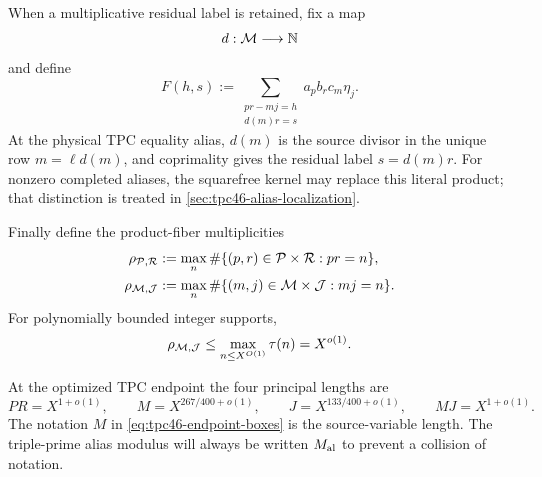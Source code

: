 When a multiplicative residual label is retained, fix a map
\begin{equation}
 d:\mathcal M\longrightarrow\mathbb N
 \label{eq:tpc46-d-map}
\end{equation}
and define
\begin{equation}
 F(h,s)
 :=\sum_{\substack{pr-mj=h\\d(m)r=s}}
 a_pb_rc_m\eta_j.
 \label{eq:tpc46-residual-packet}
\end{equation}
At the physical TPC equality alias, \(d(m)\) is the source divisor in
the unique row \(m=\ell d(m)\), and coprimality gives the residual label
\(s=d(m)r\).  For nonzero completed aliases, the squarefree kernel may
replace this literal product; that distinction is treated in
\cref{sec:tpc46-alias-localization}.

Finally define the product-fiber multiplicities
\begin{align}
 \rho_{\mathcal P,\mathcal R}
 &:=
 \max_n\#\{(p,r)\in\mathcal P\times\mathcal R:pr=n\},
 \label{eq:tpc46-rho-pr}\\
 \rho_{\mathcal M,\mathcal J}
 &:=
 \max_n\#\{(m,j)\in\mathcal M\times\mathcal J:mj=n\}.
 \label{eq:tpc46-rho-mj}
\end{align}
For polynomially bounded integer supports,
\begin{equation}
 \rho_{\mathcal M,\mathcal J}
 \le\max_{n\le X^{O(1)}}\tau(n)=X^{o(1)}.
 \label{eq:tpc46-divisor-multiplicity}
\end{equation}

At the optimized TPC endpoint the four principal lengths are
\begin{equation}
 P R=X^{1+o(1)},
 \qquad
 M=X^{267/400+o(1)},
 \qquad
 J=X^{133/400+o(1)},
 \qquad
 MJ=X^{1+o(1)}.
 \label{eq:tpc46-endpoint-boxes}
\end{equation}
The notation \(M\) in
\eqref{eq:tpc46-endpoint-boxes} is the source-variable length.  The
triple-prime alias modulus will always be written
\(M_{\rm al}\) to prevent a collision of notation.
